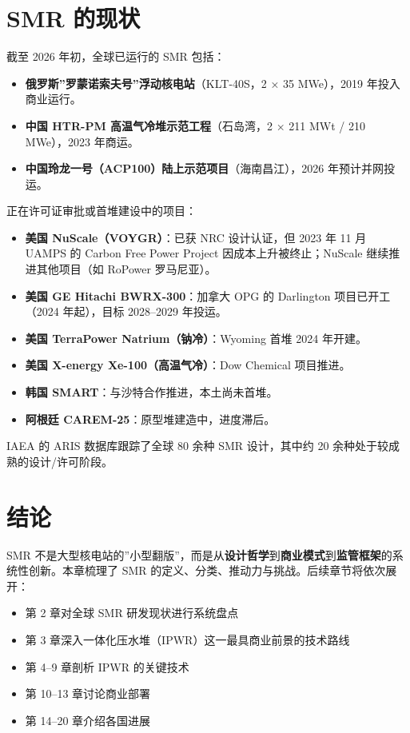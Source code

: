 \documentclass[
  UTF8,
  scheme=plain,
  fontsize=10pt,
  openany
]{ctexbook}
\begin{document}
\section{SMR 的现状}\label{smr-ux7684ux73b0ux72b6}

截至 2026 年初，全球已运行的 SMR 包括：

\begin{itemize}
\tightlist
\item
  \textbf{俄罗斯''罗蒙诺索夫号''浮动核电站}（KLT-40S，2 × 35 MWe），2019
  年投入商业运行。
\item
  \textbf{中国 HTR-PM 高温气冷堆示范工程}（石岛湾，2 × 211 MWt / 210
  MWe），2023 年商运。
\item
  \textbf{中国玲龙一号（ACP100）陆上示范项目}（海南昌江），2026
  年预计并网投运。
\end{itemize}

正在许可证审批或首堆建设中的项目：

\begin{itemize}
\tightlist
\item
  \textbf{美国 NuScale（VOYGR）}：已获 NRC 设计认证，但 2023 年 11 月
  UAMPS 的 Carbon Free Power Project 因成本上升被终止；NuScale
  继续推进其他项目（如 RoPower 罗马尼亚）。
\item
  \textbf{美国 GE Hitachi BWRX-300}：加拿大 OPG 的 Darlington
  项目已开工（2024 年起），目标 2028--2029 年投运。
\item
  \textbf{美国 TerraPower Natrium（钠冷）}：Wyoming 首堆 2024 年开建。
\item
  \textbf{美国 X-energy Xe-100（高温气冷）}：Dow Chemical 项目推进。
\item
  \textbf{韩国 SMART}：与沙特合作推进，本土尚未首堆。
\item
  \textbf{阿根廷 CAREM-25}：原型堆建造中，进度滞后。
\end{itemize}

IAEA 的 ARIS 数据库跟踪了全球 80 余种 SMR 设计，其中约 20
余种处于较成熟的设计/许可阶段。

\section{结论}\label{ux7ed3ux8bba}

SMR
不是大型核电站的''小型翻版''，而是从\textbf{设计哲学}到\textbf{商业模式}到\textbf{监管框架}的系统性创新。本章梳理了
SMR 的定义、分类、推动力与挑战。后续章节将依次展开：

\begin{itemize}
\tightlist
\item
  第 2 章对全球 SMR 研发现状进行系统盘点
\item
  第 3 章深入一体化压水堆（IPWR）这一最具商业前景的技术路线
\item
  第 4--9 章剖析 IPWR 的关键技术
\item
  第 10--13 章讨论商业部署
\item
  第 14--20 章介绍各国进展
\end{itemize}
\end{document}

